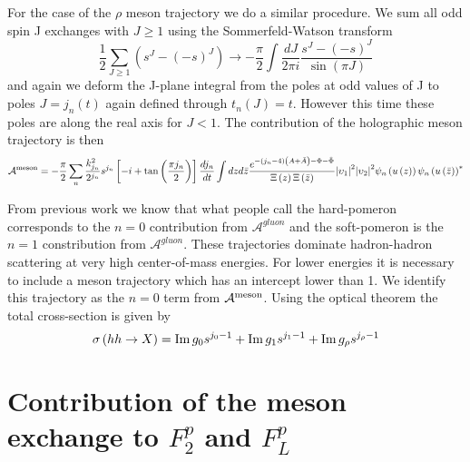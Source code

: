 \documentclass[a4paper,12pt]{article}
\begin{document}
For the case of the $\rho$ meson trajectory we do a similar procedure. We sum all odd spin J exchanges with $J \geqslant 1$ using the Sommerfeld-Watson transform
\begin{equation}
\frac{1}{2} \sum_{J \geqslant 1} \left( s^J - {\left(-s\right)}^J \right) \rightarrow - \frac{\pi}{2} \int \frac{dJ}{2 \pi i} \frac{s^J - {\left(-s\right)}^J}{\sin\left(\pi J\right)}
\end{equation}
and again we deform the J-plane integral from the poles at odd values of J to poles $J = j_n\left(t\right)$ again defined through $t_n\left(J\right) = t$. However this time these poles are along the real axis for $J < 1$.
The contribution of the holographic meson trajectory is then
\begin{equation}
\mathcal{A}^{\rm {meson}} = - \frac{\pi}{2} \sum_n \frac{k_{j_n}^2}{2^{j_n}} s^{j_n} \left[-i + \tan \left( \frac{\pi j_n}{2} \right) \right] \frac{d j_n}{dt} \int dz d\bar{z} \frac{e^{-\left(j_n - 4\right) \left(A+\bar{A}\right)-\Phi - \bar{\Phi}}}{\Xi\left(z\right) \Xi\left(\bar{z}\right)} {|\upsilon_1|}^2 {|\upsilon_2|}^2 \psi_n \left(u\left(z\right)\right) {\psi_n \left(u\left(\bar{z}\right)\right)}^*
\end{equation}

From previous work we know that what people call the hard-pomeron corresponds to the $n=0$ contribution from $\mathcal{A}^{gluon}$ and the soft-pomeron is the $n=1$ constribution from $\mathcal{A}^{gluon}$. These trajectories dominate hadron-hadron scattering at very high center-of-mass energies. For lower energies it is necessary to include a meson trajectory which has an intercept lower than 1. We identify this trajectory as the $n=0$ term from $\mathcal{A}^{\rm {meson}}$. Using the optical theorem the total cross-section is given by
\begin{equation}
\sigma\left(h h \rightarrow X\right) = {\rm Im} \, g_0 s^{j_0 - 1} +  {\rm Im} \, g_1 s^{j_1 - 1} +  {\rm Im} \, g_\rho s^{j_\rho - 1}
\end{equation}

\section{Contribution of the meson exchange to $F^p_2$ and $F^p_L$}
\end{document}
